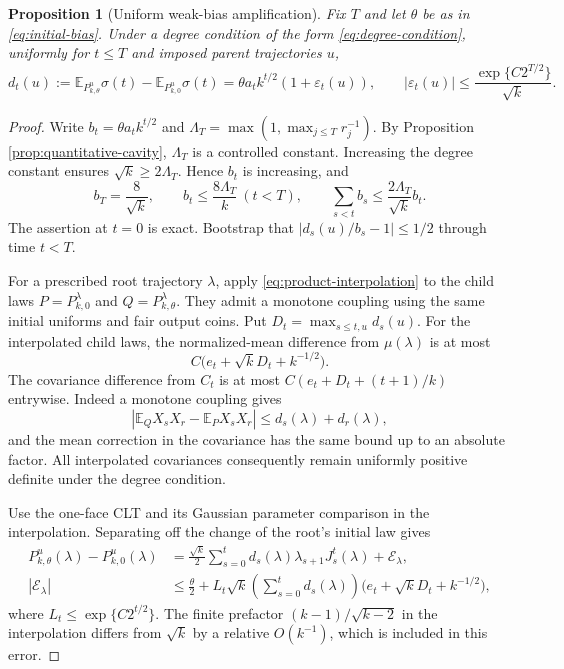 \documentclass[11pt]{article}
\newtheorem{proposition}[theorem]{Proposition}
\theoremstyle{remark}\newtheorem{remark}[theorem]{Remark}
\newcommand{\E}{\mathbb E}
\begin{document}
\begin{proposition}[Uniform weak-bias amplification]\label{prop:bias-uniform}
Fix $T$ and let $\theta$ be as in \eqref{eq:initial-bias}. Under a degree
condition of the form \eqref{eq:degree-condition}, uniformly for $t\le T$
and imposed parent trajectories $u$,
\begin{equation}\label{eq:bias-amplification}
 d_t(u):=\E_{P_{k,\theta}^{u}}\sigma(t)
          -\E_{P_{k,0}^{u}}\sigma(t)
 =\theta a_t k^{t/2}(1+\varepsilon_t(u)),
 \qquad
 |\varepsilon_t(u)|\le
       \frac{\exp\{C2^{T/2}\}}{\sqrt k}.
\end{equation}
\end{proposition}
\begin{proof}
Write $b_t=\theta a_t k^{t/2}$ and
$\Lambda_T=\max(1,\max_{j\le T}r_j^{-1})$.
By Proposition \ref{prop:quantitative-cavity}, $\Lambda_T$ is a controlled
constant. Increasing the degree constant ensures
$\sqrt k\ge2\Lambda_T$. Hence $b_t$ is increasing, and
\begin{equation}\label{eq:bias-size-bounds}
 b_T=\frac8{\sqrt k},\qquad
 b_t\le\frac{8\Lambda_T}{k}\ (t<T),\qquad
 \sum_{s<t}b_s\le\frac{2\Lambda_T}{\sqrt k}b_t.
\end{equation}
The assertion at $t=0$ is exact. Bootstrap that
$|d_s(u)/b_s-1|\le1/2$ through time $t<T$.

For a prescribed root trajectory $\lambda$, apply
\eqref{eq:product-interpolation} to the child laws
$P=P_{k,0}^{\lambda}$ and $Q=P_{k,\theta}^{\lambda}$.
They admit a monotone coupling using the same initial uniforms and fair
output coins. Put $D_t=\max_{s\le t,u}d_s(u)$.
For the interpolated child laws, the normalized-mean difference from
$\mu(\lambda)$ is at most
\[
 C\bigl(e_t+\sqrt kD_t+k^{-1/2}\bigr).
\]
The covariance difference from $C_t$ is at most
$C(e_t+D_t+(t+1)/k)$ entrywise. Indeed a monotone coupling gives
\[
 |\E_QX_sX_r-\E_PX_sX_r|\le d_s(\lambda)+d_r(\lambda),
\]
and the mean correction in the covariance has the same bound up to an
absolute factor. All interpolated covariances consequently remain
uniformly positive definite under the degree condition.

Use the one-face CLT and its Gaussian parameter comparison in the
interpolation. Separating off the change of the root's initial law gives
\begin{align}
 P_{k,\theta}^{u}(\lambda)-P_{k,0}^{u}(\lambda)
 &=\frac{\sqrt k}{2}\sum_{s=0}^t
       d_s(\lambda)\lambda_{s+1}J_s^t(\lambda)+\mathcal E_\lambda,
 \label{eq:bias-path-expansion}\\
 |\mathcal E_\lambda|
 &\le\frac\theta2+
 L_t\sqrt k\left(\sum_{s=0}^td_s(\lambda)\right)
       \bigl(e_t+\sqrt kD_t+k^{-1/2}\bigr),
 \label{eq:bias-path-error}
\end{align}
where $L_t\le\exp\{C2^{t/2}\}$.
The finite prefactor $(k-1)/\sqrt{k-2}$ in the interpolation differs
from $\sqrt k$ by a relative $O(k^{-1})$, which is included in this error.


\end{proof}
\end{document}
